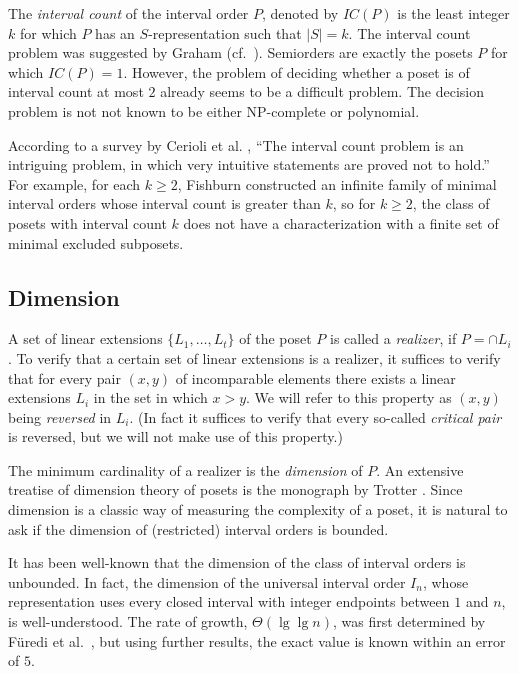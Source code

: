 The \emph{interval count} of the interval order $P$, denoted by $IC(P)$ is the least integer $k$ for which $P$ has an $S$-representation such that $|S|=k$. The interval count problem was suggested by Graham (cf.~\cite{LAP-82}). Semiorders are exactly the posets $P$ for which $IC(P)=1$. However, the problem of deciding whether a poset is of interval count at most $2$ already seems to be a difficult problem. The decision problem is not not known to be either NP-complete or polynomial.

According to a survey by Cerioli et al. \cite{COS-12}, ``The interval count problem is an intriguing problem, in which very intuitive statements are proved not to hold.'' For example, for each $k\geq 2$, Fishburn \cite{F} constructed an infinite family of minimal interval orders whose interval count is greater than $k$, so for $k\geq 2$, the class of posets with interval count $k$ does not have a characterization with a finite set of minimal excluded subposets.

\subsection{Dimension}
A set of linear extensions $\{L_1,\ldots,L_t\}$ of the poset $P$ is called a \emph{realizer}, if $P=\cap L_i$. To verify that a certain set of linear extensions is a realizer, it suffices to verify that for every pair $(x,y)$ of incomparable elements there exists a linear extensions $L_i$ in the set in which $x>y$. We will refer to this property as $(x,y)$ being \emph{reversed} in $L_i$. (In fact it suffices to verify that every so-called \emph{critical pair} is reversed, but we will not make use of this property.)

The minimum cardinality of a realizer is the \emph{dimension} of $P$. An extensive treatise of dimension theory of posets is the monograph by Trotter \cite{T}. Since dimension is a classic way of measuring the complexity of a poset, it is natural to ask if the dimension of (restricted) interval orders is bounded.

It has been well-known that the dimension of the class of interval orders is unbounded. In fact, the dimension of the universal interval order $I_n$, whose representation uses every closed interval with integer endpoints between $1$ and $n$, is well-understood. The rate of growth, $\Theta(\lg\lg n)$, was first determined by F\"uredi et al.~\cite{FHRT-92}, but using further results, the exact value is known within an error of $5$.

